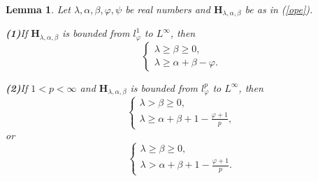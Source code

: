 \documentclass[10pt]{amsart}
\newtheorem{lemma}[theorem]{Lemma}
\theoremstyle{definition}    %
\numberwithin{equation}{section}
\begin{document}
\begin{lemma}\label{ll-5-add}
Let $\lambda, \alpha, \beta, \varphi, \psi$ be real numbers and $\mathbf{H}_{\lambda, \alpha, \beta}$ be as in (\ref{ope}). 

{\bf (1)}If $\mathbf{H}_{\lambda, \alpha, \beta}$ is bounded from 
$l_{\varphi}^1$ to $L^{\infty}$, then  
\begin{equation} 
\begin{cases}
\lambda\geq \beta\geq 0, \\
\lambda\geq \alpha+\beta-\varphi. \nonumber 
\end{cases}
\end{equation}

{\bf (2)}If $1<p<\infty$ and $\mathbf{H}_{\lambda, \alpha, \beta}$ is bounded from 
$l_{\varphi}^p$ to $L^{\infty}$, then  
\begin{equation}\label{ad-eq-1}
\begin{cases}
\lambda>\beta\geq0, \\
\lambda\geq\alpha+\beta+1-\frac{\varphi+1}{p}, 
\end{cases}
\end{equation}
or
\begin{equation}\label{ad-eq-2}
\begin{cases}
\lambda\geq \beta\geq0, \\
\lambda>\alpha+\beta+1-\frac{\varphi+1}{p}. 
\end{cases}
\end{equation}
\end{lemma}
\end{document}
